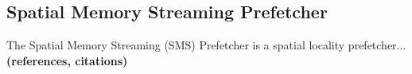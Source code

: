 \subsection{Spatial Memory Streaming Prefetcher}
\label{sec:smsPrefetcher}
The Spatial Memory Streaming (SMS) Prefetcher is a spatial locality
prefetcher...  {\bf (references, citations)}
